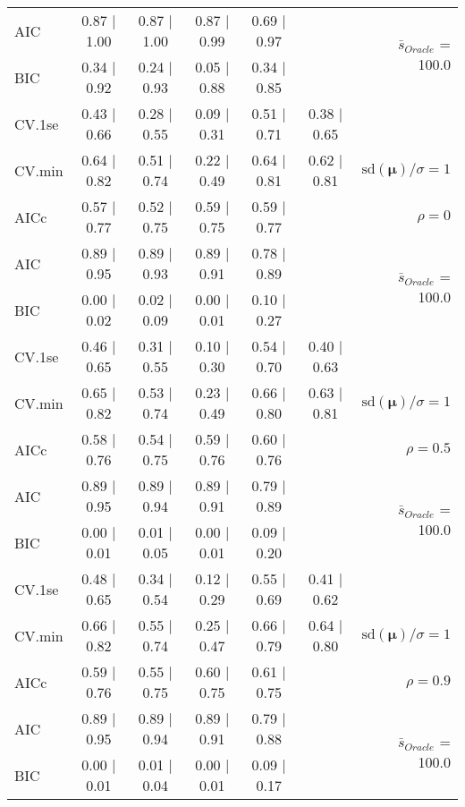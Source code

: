 \begin{table}
\begin{center}
\begin{tabular}{l*{5}{c}|r}
AIC & 0.87 $\mid$ 1.00 & 0.87 $\mid$ 1.00 & 0.87 $\mid$ 0.99 & 0.69 $\mid$ 0.97 & &  \multirow{2}{*}{$\bar{s}_{Oracle}$ = 100.0} \\
BIC & 0.34 $\mid$ 0.92 & 0.24 $\mid$ 0.93 & 0.05 $\mid$ 0.88 & 0.34 $\mid$ 0.85 & &  \\
 \hline 
CV.1se & 0.43 $\mid$ 0.66 & 0.28 $\mid$ 0.55 & 0.09 $\mid$ 0.31 & 0.51 $\mid$ 0.71 & 0.38 $\mid$ 0.65 & \\
CV.min & 0.64 $\mid$ 0.82 & 0.51 $\mid$ 0.74 & 0.22 $\mid$ 0.49 & 0.64 $\mid$ 0.81 & 0.62 $\mid$ 0.81 &  $\mathrm{sd}(\mathbf{\mu})/\sigma=1$ \\
AICc & 0.57 $\mid$ 0.77 & 0.52 $\mid$ 0.75 & 0.59 $\mid$ 0.75 & 0.59 $\mid$ 0.77 & & $\rho=0$ \\
AIC & 0.89 $\mid$ 0.95 & 0.89 $\mid$ 0.93 & 0.89 $\mid$ 0.91 & 0.78 $\mid$ 0.89 & &  \multirow{2}{*}{$\bar{s}_{Oracle}$ = 100.0} \\
BIC & 0.00 $\mid$ 0.02 & 0.02 $\mid$ 0.09 & 0.00 $\mid$ 0.01 & 0.10 $\mid$ 0.27 & &  \\
 \hline 
CV.1se & 0.46 $\mid$ 0.65 & 0.31 $\mid$ 0.55 & 0.10 $\mid$ 0.30 & 0.54 $\mid$ 0.70 & 0.40 $\mid$ 0.63 & \\
CV.min & 0.65 $\mid$ 0.82 & 0.53 $\mid$ 0.74 & 0.23 $\mid$ 0.49 & 0.66 $\mid$ 0.80 & 0.63 $\mid$ 0.81 &  $\mathrm{sd}(\mathbf{\mu})/\sigma=1$ \\
AICc & 0.58 $\mid$ 0.76 & 0.54 $\mid$ 0.75 & 0.59 $\mid$ 0.76 & 0.60 $\mid$ 0.76 & & $\rho=0.5$ \\
AIC & 0.89 $\mid$ 0.95 & 0.89 $\mid$ 0.94 & 0.89 $\mid$ 0.91 & 0.79 $\mid$ 0.89 & &  \multirow{2}{*}{$\bar{s}_{Oracle}$ = 100.0} \\
BIC & 0.00 $\mid$ 0.01 & 0.01 $\mid$ 0.05 & 0.00 $\mid$ 0.01 & 0.09 $\mid$ 0.20 & &  \\
 \hline 
CV.1se & 0.48 $\mid$ 0.65 & 0.34 $\mid$ 0.54 & 0.12 $\mid$ 0.29 & 0.55 $\mid$ 0.69 & 0.41 $\mid$ 0.62 & \\
CV.min & 0.66 $\mid$ 0.82 & 0.55 $\mid$ 0.74 & 0.25 $\mid$ 0.47 & 0.66 $\mid$ 0.79 & 0.64 $\mid$ 0.80 &  $\mathrm{sd}(\mathbf{\mu})/\sigma=1$ \\
AICc & 0.59 $\mid$ 0.76 & 0.55 $\mid$ 0.75 & 0.60 $\mid$ 0.75 & 0.61 $\mid$ 0.75 & & $\rho=0.9$ \\
AIC & 0.89 $\mid$ 0.95 & 0.89 $\mid$ 0.94 & 0.89 $\mid$ 0.91 & 0.79 $\mid$ 0.88 & &  \multirow{2}{*}{$\bar{s}_{Oracle}$ = 100.0} \\
BIC & 0.00 $\mid$ 0.01 & 0.01 $\mid$ 0.04 & 0.00 $\mid$ 0.01 & 0.09 $\mid$ 0.17 & &  \\

\end{tabular}
\end{center}
\end{table}
